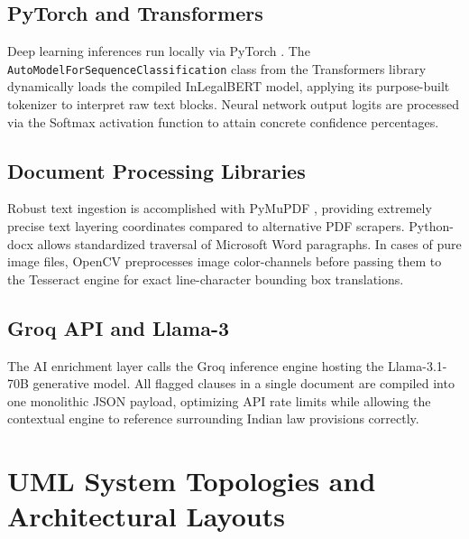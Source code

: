 \documentclass[a4paper,12pt]{report}
\begin{document}
\subsection{PyTorch and Transformers}

Deep learning inferences run locally via PyTorch \cite{pytorch}. The \texttt{AutoModelForSequenceClassification} class from the Transformers library dynamically loads the compiled InLegalBERT model, applying its purpose-built tokenizer to interpret raw text blocks. Neural network output logits are processed via the Softmax activation function to attain concrete confidence percentages.

\subsection{Document Processing Libraries}

Robust text ingestion is accomplished with PyMuPDF \cite{pymupdf}, providing extremely precise text layering coordinates compared to alternative PDF scrapers. Python-docx allows standardized traversal of Microsoft Word paragraphs. In cases of pure image files, OpenCV preprocesses image color-channels before passing them to the Tesseract engine for exact line-character bounding box translations.

\subsection{Groq API and Llama-3}

The AI enrichment layer calls the Groq inference engine hosting the Llama-3.1-70B generative model. All flagged clauses in a single document are compiled into one monolithic JSON payload, optimizing API rate limits while allowing the contextual engine to reference surrounding Indian law provisions correctly.

\section{UML System Topologies and Architectural Layouts}
\end{document}
